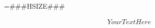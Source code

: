 \documentclass[preview]{standalone}
\begin{document}
\hsize=###HSIZE###

\begin{align*}
    YourTextHere
\end{align*}
\end{document}
